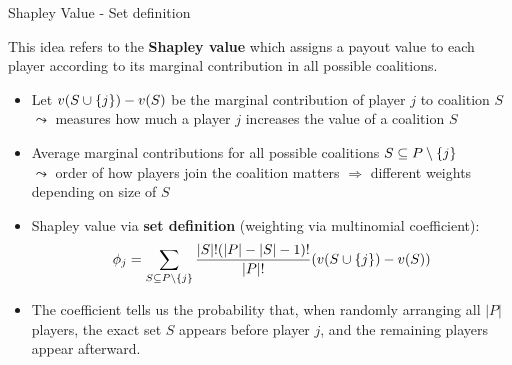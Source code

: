 \documentclass[11pt,compress,t,notes=noshow, aspectratio=169, xcolor=table]{beamer}
\begin{document}
\begin{frame}{Shapley Value - Set definition}

This idea refers to the \textbf{Shapley value} which assigns a payout value to each player according to its marginal contribution in all possible coalitions.
  
\begin{itemize}[<+->]
  \item Let $v(\Scupj) - v(S)$ be the marginal contribution of player $j$ to coalition $S$\\
  $\leadsto$ measures how much a player $j$ increases the value of a coalition $S$
  \item Average marginal contributions for all possible coalitions $\SsubPnoj$ \\
  $\leadsto$ order of how players join the coalition matters $\Rightarrow$ different weights depending on size of $S$\\
  \item Shapley value via \textbf{set definition} (weighting via multinomial coefficient): 
  $$\phi_j = \sum_{\SsubPnoj} \frac{|S|!(|P| - |S| - 1)!}{|P|!}(v(\Scupj) - v(S))$$
  \item The coefficient tells us the probability that, when randomly arranging all $|P|$ players, the exact set $S$ appears before player $j$, and the remaining players appear afterward.   
\end{itemize}

\end{frame}
\end{document}
